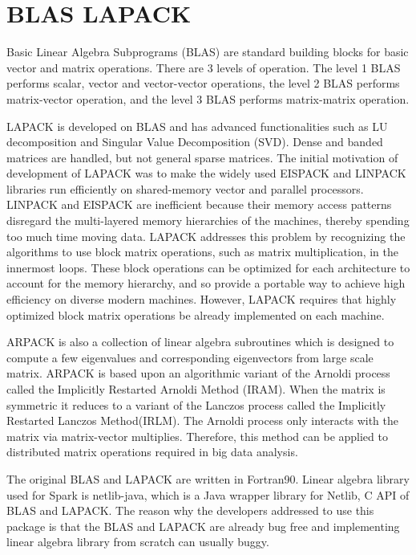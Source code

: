 \section{BLAS LAPACK}
\label{sec:history}

Basic Linear Algebra Subprograms (BLAS) are standard building blocks for basic vector and matrix operations. There are 3 levels of operation. The level 1 BLAS performs scalar, 
vector and vector-vector operations, the level 2 BLAS performs matrix-vector operation, and the level 3 BLAS performs matrix-matrix operation. 

LAPACK is developed on BLAS and has advanced functionalities such as LU decomposition and Singular Value Decomposition (SVD). Dense and banded matrices are handled, but not general 
sparse matrices. The initial motivation of development of LAPACK was to make the widely used EISPACK and LINPACK libraries run efficiently on shared-memory vector and parallel processors. 
LINPACK and EISPACK are inefficient because their memory access patterns disregard the multi-layered memory hierarchies of the machines, thereby spending too much time moving data. 
LAPACK addresses this problem by recognizing the algorithms to use block matrix operations, such as matrix multiplication, in the innermost loops. These block operations can be optimized for each architecture to account for the memory hierarchy, 
and so provide a portable way to achieve high efficiency on diverse modern machines. However, LAPACK requires that highly optimized block matrix operations be already implemented on each machine. 

ARPACK is also a collection of linear algebra subroutines which is designed to compute a few eigenvalues and corresponding eigenvectors from large scale matrix. 
ARPACK is based upon an algorithmic variant of the Arnoldi process called the Implicitly Restarted Arnoldi Method (IRAM). 
When the matrix is symmetric it reduces to a variant of the Lanczos process called the Implicitly Restarted Lanczos Method(IRLM). The Arnoldi process only interacts with the matrix via matrix-vector multiplies. 
Therefore, this method can be applied to distributed matrix operations required in big data analysis.


The original BLAS and LAPACK are written in Fortran90. Linear algebra library used for Spark is netlib-java, which is a Java wrapper library for Netlib, C API of BLAS and LAPACK. 
The reason why the developers addressed to use this package is that the BLAS and LAPACK are already bug free and implementing linear algebra library from scratch can usually buggy. 

